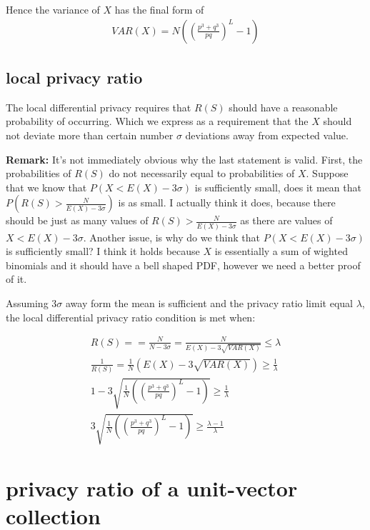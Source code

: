 \documentclass[11pt,draft]{article}
\begin{document}
Hence the variance of $X$ has the final form of
\begin{align}
VAR(X) = N   \left (  \left ( \frac{p^3 + q^3}{pq} \right )^L - 1 \right )
\end{align}

\subsection{local privacy ratio}

The local differential privacy requires that $R(S)$ should have a reasonable probability of occurring.  Which we express as a requirement that the $X$ should not deviate more than certain number $\sigma$ deviations away from expected value. 

\textbf{Remark: }  It's not immediately obvious why the last statement is valid.  First, the probabilities of $R(S)$ do not necessarily equal to probabilities of $X$.  Suppose that we know that $P(X< E(X) - 3\sigma)$ is sufficiently small, does it mean that $P(R(S) >  \frac{N}{E(X) - 3\sigma})$ is as small.  I actually think it does, because there should be just as many values of $R(S) >   \frac{N}{E(X) - 3\sigma}$  as there are values of $X< E(X) - 3\sigma$.   Another issue, is why do we think that $P(X< E(X) - 3\sigma)$ is sufficiently small?  I think it holds because $X$ is essentially a sum of wighted binomials and it should have a bell shaped PDF, however we need a better proof of it.

 Assuming $3\sigma$ away form the mean is sufficient and the privacy ratio limit equal $\lambda$, the local differential privacy ratio condition is met when: 

\begin{align}
R(S) =   =   \frac{N}{N - 3\sigma} = \frac{N}{E(X) - 3\sqrt{VAR(X)}} \le \lambda  \\
\frac{1}{R(S)} =   \frac{1}{N}   (E(X) - 3\sqrt{VAR(X)}) \ge \frac{1}{\lambda}  \\
1 - 3 \sqrt{\frac{1}{N} \left (  \left ( \frac{p^3 + q^3}{pq} \right )^L - 1 \right )}  \ge \frac{1}{\lambda}  \\
3 \sqrt{\frac{1}{N} \left (  \left ( \frac{p^3 + q^3}{pq} \right )^L - 1 \right )}  \ge \frac{\lambda - 1}{\lambda} 
\end{align}

\section{privacy ratio of a unit-vector collection}
\end{document}
